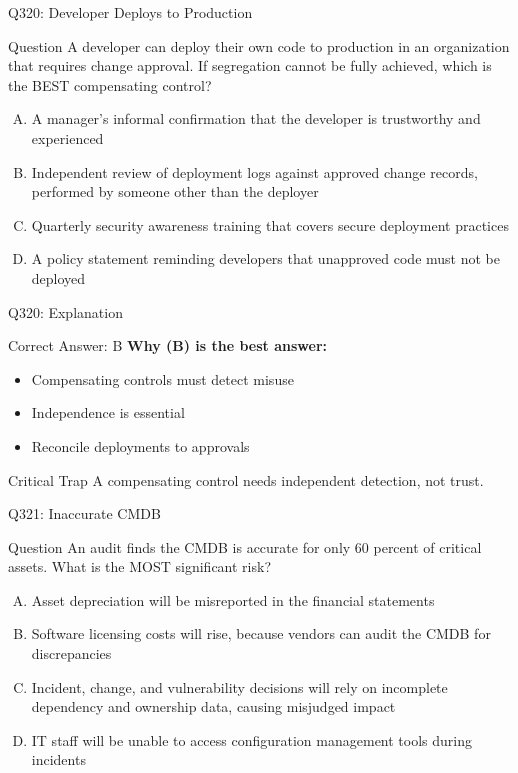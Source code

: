 \documentclass{beamer}
\begin{document}
	\begin{frame}{Q320: Developer Deploys to Production}
		\begin{block}{Question}
			\small A developer can deploy their own code to production in an organization that requires change approval. If segregation cannot be fully achieved, which is the BEST compensating control?
		\end{block}
		\begin{enumerate}[(A)]
			\footnotesize
			\item A manager's informal confirmation that the developer is trustworthy and experienced
			\item Independent review of deployment logs against approved change records, performed by someone other than the deployer
			\item Quarterly security awareness training that covers secure deployment practices
			\item A policy statement reminding developers that unapproved code must not be deployed
		\end{enumerate}
	\end{frame}
	
	\begin{frame}{Q320: Explanation}
		\begin{block}{Correct Answer: B}
			\textbf{Why (B) is the best answer:}
			\begin{itemize}
				\item Compensating controls must detect misuse
				\item Independence is essential
				\item Reconcile deployments to approvals
			\end{itemize}
		\end{block}
		\begin{alertblock}{Critical Trap}
			A compensating control needs independent detection, not trust.
		\end{alertblock}
	\end{frame}
	
	\begin{frame}{Q321: Inaccurate CMDB}
		\begin{block}{Question}
			\small An audit finds the CMDB is accurate for only 60 percent of critical assets. What is the MOST significant risk?
		\end{block}
		\begin{enumerate}[(A)]
			\footnotesize
			\item Asset depreciation will be misreported in the financial statements
			\item Software licensing costs will rise, because vendors can audit the CMDB for discrepancies
			\item Incident, change, and vulnerability decisions will rely on incomplete dependency and ownership data, causing misjudged impact
			\item IT staff will be unable to access configuration management tools during incidents
		\end{enumerate}
	\end{frame}
	
\end{document}
